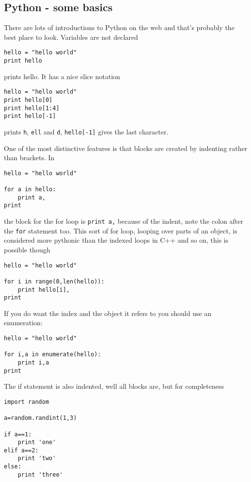 \documentclass[11pt,a4paper]{scrartcl}
\begin{document}
\subsection*{Python - some basics}
There are lots of introductions to Python on the web and that's
probably the best place to look. Variables are not declared
\begin{lstlisting}[numbers=right]
hello = "hello world"
print hello
\end{lstlisting}
prints hello. It has a nice slice notation
\begin{lstlisting}[numbers=right]
hello = "hello world"
print hello[0]
print hello[1:4]
print hello[-1]
\end{lstlisting}
prints \texttt{h}, \texttt{ell} and \texttt{d}, \texttt{hello[-1]}
gives the last character. 

One of the most distinctive features is that blocks are created by
indenting rather than brackets. In
\begin{lstlisting}[numbers=right]
hello = "hello world"

for a in hello:
    print a,
print 
\end{lstlisting}
the block for the for loop is \texttt{print a,} because of the indent,
note the colon after the \texttt{for} statement too. This sort of for
loop, looping over parts of an object, is considered more pythonic
than the indexed loops in C++ and so on, this is possible though
\begin{lstlisting}[numbers=right]
hello = "hello world"

for i in range(0,len(hello)):
    print hello[i],
print 
\end{lstlisting}
If you do want the index and the object it refers to you should use an
enumeration:
\begin{lstlisting}[numbers=right]
hello = "hello world"

for i,a in enumerate(hello):
    print i,a
print 
\end{lstlisting}
The if statement is also indented, well all blocks are, but for completeness
\begin{lstlisting}[numbers=right]
import random

a=random.randint(1,3)

if a==1:
    print 'one'
elif a==2:
    print 'two'
else:
    print 'three'
\end{lstlisting}
\end{document}
